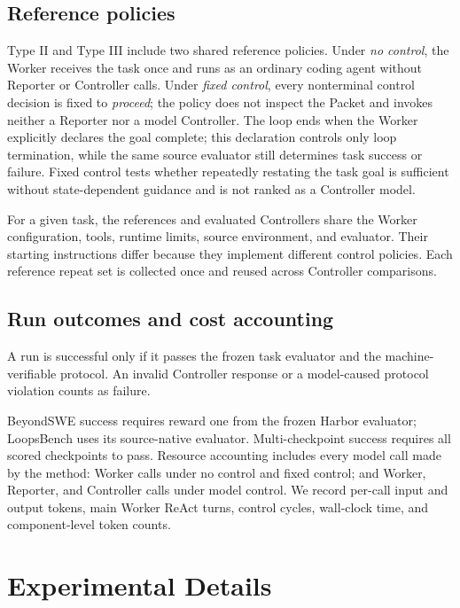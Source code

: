 \subsection{Reference policies}

Type II and Type III include two shared reference policies. Under \emph{no control}, the Worker receives the task once and runs as an ordinary coding agent without Reporter or Controller calls. Under \emph{fixed control}, every nonterminal control decision is fixed to \emph{proceed}; the policy does not inspect the Packet and invokes neither a Reporter nor a model Controller. The loop ends when the Worker explicitly declares the goal complete; this declaration controls only loop termination, while the same source evaluator still determines task success or failure. Fixed control tests whether repeatedly restating the task goal is sufficient without state-dependent guidance and is not ranked as a Controller model.

For a given task, the references and evaluated Controllers share the Worker configuration, tools, runtime limits, source environment, and evaluator. Their starting instructions differ because they implement different control policies. Each reference repeat set is collected once and reused across Controller comparisons.

\subsection{Run outcomes and cost accounting}

A run is successful only if it passes the frozen task evaluator and the machine-verifiable protocol. An invalid Controller response or a model-caused protocol violation counts as failure.

BeyondSWE success requires reward one from the frozen Harbor evaluator; LoopsBench uses its source-native evaluator. Multi-checkpoint success requires all scored checkpoints to pass. Resource accounting includes every model call made by the method: Worker calls under no control and fixed control; and Worker, Reporter, and Controller calls under model control. We record per-call input and output tokens, main Worker ReAct turns, control cycles, wall-clock time, and component-level token counts.

\section{Experimental Details}
\label{app:criteria}

